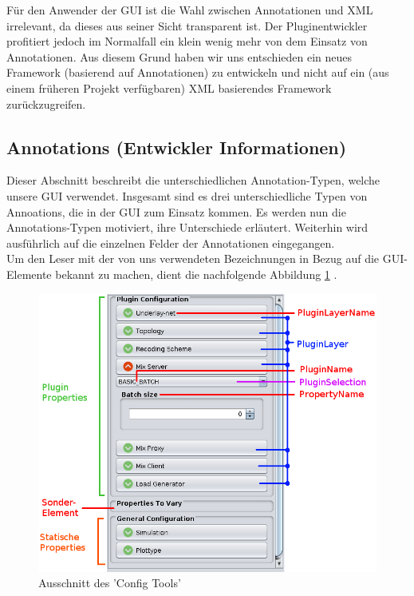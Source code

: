 \documentclass[a4paper, 11pt]{article} %
\begin{document}
Für den Anwender der GUI ist die Wahl zwischen Annotationen und XML irrelevant, da dieses aus seiner Sicht transparent ist. Der Pluginentwickler profitiert jedoch im Normalfall ein klein wenig mehr von dem Einsatz von Annotationen. Aus diesem Grund haben wir uns entschieden ein neues Framework (basierend auf Annotationen) zu entwickeln und nicht auf ein (aus einem früheren Projekt verfügbaren) XML basierendes Framework zurückzugreifen.



\newpage
\subsection{Annotations (Entwickler Informationen)} %
\label{sub:annotations}
Dieser Abschnitt beschreibt die unterschiedlichen Annotation-Typen, welche unsere GUI verwendet. Insgesamt sind es drei unterschiedliche Typen von Annoations, die in der GUI zum Einsatz kommen. Es werden nun die Annotations-Typen motiviert, ihre Unterschiede erläutert. Weiterhin wird ausführlich auf die einzelnen Felder der Annotationen eingegangen.\\

Um den Leser mit der von uns verwendeten Bezeichnungen in Bezug auf die GUI-Elemente bekannt zu machen, dient die nachfolgende Abbildung \ref{fig:guielements} . 

\begin{figure}[!htp]

\includegraphics[scale=0.56]{img/configtool_edit.png}

\caption{Ausschnitt des 'Config Tools'}
\label{fig:guielements}
\end{figure}
\end{document}
